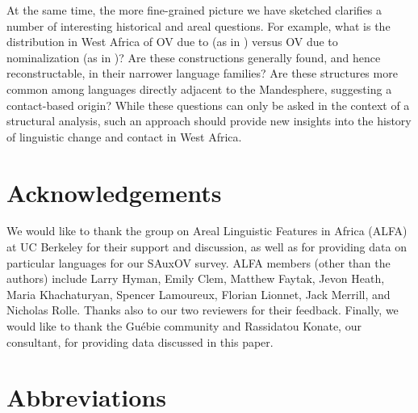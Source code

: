 \documentclass[output=paper,newtxmath,modfonts,nonflat,draftmode]{langsci/langscibook}
\begin{document}
At the same time, the more fine-grained picture we have sketched clarifies a number of interesting historical and areal questions. For example, what is the distribution in West Africa of OV due to  (as in ) versus OV due to nominalization (as in )? Are these constructions generally found, and hence reconstructable, in their narrower language families? Are these structures more common among languages directly adjacent to the Mandesphere, suggesting a contact-based origin? While these questions can only be asked in the context of a structural analysis, such an approach should provide new insights into the history of linguistic change and contact in West Africa.


\section*{Acknowledgements}
We would like to thank the group on Areal Linguistic Features in Africa (ALFA) at UC Berkeley for their support and discussion, as well as for providing data on particular languages for our SAuxOV survey. ALFA members (other than the authors) include Larry Hyman, Emily Clem, Matthew Faytak, Jevon Heath, Maria Khachaturyan, Spencer Lamoureux, Florian Lionnet, Jack Merrill, and Nicholas Rolle. Thanks also to our two reviewers for their feedback. Finally, we would like to thank the Guébie community and Rassidatou Konate, our  consultant, for providing data discussed in this paper.

\section*{Abbreviations}
\end{document}
